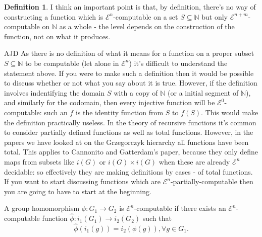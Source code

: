 \documentclass[a4paper]{article}
\newcommand{\grz}[1]{$\mathcal{E}^{#1}$}	%
\newcommand{\NN}{\mathbb{N}}	%
\newcommand{\ZZ}{\mathbb{Z}}
\theoremstyle{plain}
\newtheorem{theorem}{Theorem}[section]
\theoremstyle{definition}
\newtheorem{definition}[theorem]{Definition}
\newenvironment{ad}{\noindent\color{blue} AJD }{}
\newcommand{\ajd}[1]{
\begin{ad} #1 \end{ad}}
\begin{document}
\begin{definition}
{I think an important point is that, by definition, there's no way of constructing a function which is \grz{n}-computable on a set $S \subseteq \NN$ but only \grz{n+m}-computable on $\NN$ as a whole - the level depends on the construction of the function, not on what it produces.}
\ajd{As there is no definition of what it means for a function on a 
proper subset $S\subseteq \NN$ to be computable (let alone in \grz{n}) 
it's difficult to understand the statement above. 
If you were to make such a definition then it
would be possible to discuss whether or not what you say about it is true. 
However, if the definition involves indentifying the domain $S$ with a copy
of $\NN$ (or a initial segment of $\NN$), and similarly for the codomain,
 then  every injective function will be  \grz{0}-computable: such an 
$f$ is the 
identity function from $S$ to $f(S)$. This would make the definition
practically useless. 
In the theory of recursive functions it's common to consider partially 
defined functions as well as total functions. However, in the papers
we have looked at on the Grzegorczyk hierarchy all functions have been
total. This applies to Cannonito and Gatterdam's paper, because they 
only define maps from subsets like $i(G)$ or $i(G)\times i(G)$ when these
are already \grz{n} decidable: so effectively they are making definitions
by cases - of total functions. If you want to start discussing functions
which are \grz{n}-partially-computable then you are going to have to
start at the beginning. } 

	A group homomorphism $\phi: G_1 \rightarrow G_2$ is \grz{n}-computable if there exists an \grz{n}-computable function $\hat{\phi}: i_1(G_1) \rightarrow i_2(G_2)$ such that
\[	\hat{\phi}(i_1(g)) = i_2(\phi(g)), \forall g \in G_1. \]
\end{definition}

\begin{comment}
		\begin{definition} \cite[Definition 3.3]{Cannonito_1973}
			A group $G$ is ``standard'' relative to an index $(i,m,j)$ if $i$ is defined by minimalisation from a presentation $1 \rightarrow K \rightarrow F \rightarrow G \rightarrow 1$ for $F$ free on at most countably many generators, $n \geq 3$, and $A \subset \ZZ_{\geq 0}$.
		\end{definition}

		\begin{theorem} \cite[Theorem 3.4]{Cannonito_1973}
			If $G$ is finitely generated and \grz{n}$(A)$ for $n \geq 3$ then any standard index of $G$ is \grz{n}$(A)$.
		\end{theorem}
\end{comment}
\end{document}
